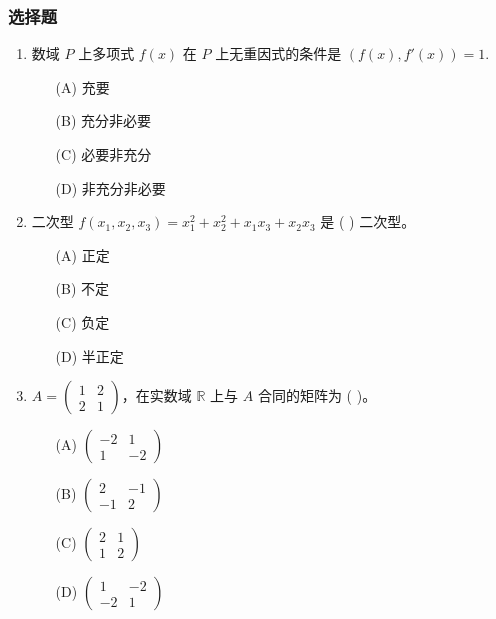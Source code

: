 \subsubsection*{选择题}

\begin{enumerate}
    \item 数域 \(P\) 上多项式 \(f(x)\) 在 \(P\) 上无重因式的条件是 \((f(x),f'(x))=1\).
    \begin{enumerate}
        \item[(A)] 充要
        \item[(B)] 充分非必要
        \item[(C)] 必要非充分
        \item[(D)] 非充分非必要
    \end{enumerate}

    \item 二次型 \(f(x_{1},x_{2},x_{3})=x_{1}^{2}+x_{2}^{2}+x_{1}x_{3}+x_{2}x_{3}\) 是 ( ) 二次型。
    \begin{enumerate}
        \item[(A)] 正定
        \item[(B)] 不定
        \item[(C)] 负定
        \item[(D)] 半正定
    \end{enumerate}

    \item \(A=\begin{pmatrix}1 & 2 \\ 2 & 1\end{pmatrix}\)，在实数域 \(\mathbb{R}\) 上与 \(A\) 合同的矩阵为 ( )。
    \begin{enumerate}
        \item[(A)] \(\begin{pmatrix}-2 & 1 \\ 1 & -2\end{pmatrix}\)
        \item[(B)] \(\begin{pmatrix}2 & -1 \\ -1 & 2\end{pmatrix}\)
        \item[(C)] \(\begin{pmatrix}2 & 1 \\ 1 & 2\end{pmatrix}\)
        \item[(D)] \(\begin{pmatrix}1 & -2 \\ -2 & 1\end{pmatrix}\)
    \end{enumerate}


\end{enumerate}
